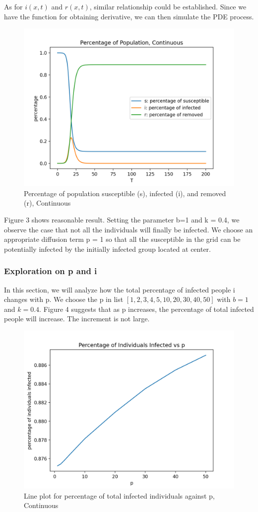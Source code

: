 \documentclass{article}
\begin{document}
\noindent
As for $i(x,t)$ and $r(x,t)$, similar relationship could be established. Since we have the function for obtaining derivative, we can then simulate the PDE process. 


\begin{figure}[htp]
\centering
\includegraphics[width=.3\textwidth]{odesimulation1.png}
\caption{Percentage of population susceptible (s), infected (i), and removed (r), Continuous }
\label{fig:figure3}
\end{figure}
\FloatBarrier



Figure 3 shows reasonable result. Setting the parameter b=1 and k = 0.4, we observe the case that not all the individuals will finally be infected. We choose an appropriate diffusion term p = 1 so that all the susceptible in the grid can be potentially infected by the initially infected group located at center. 



\subsubsection{Exploration on p and i}

In this section, we will analyze how the total percentage of infected people i changes with p. We choose the p in list $[1,2,3,4,5,10,20,30,40,50]$ with $b = 1$ and $k = 0.4$. Figure 4 suggests that as p increases, the percentage of total infected people will increase. The increment is not large. 


\begin{figure}[htp]
\centering
\includegraphics[width=.3\textwidth]{odeplot.png}
\caption{Line plot for percentage of total infected individuals against p, Continuous}
\label{fig:figure4}
\end{figure}
\FloatBarrier
\end{document}

